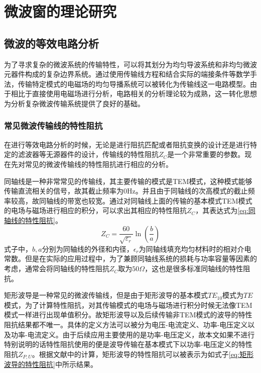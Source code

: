\documentclass[master]{thesis-uestc}
\begin{document}
\chapter{微波窗的理论研究}

\section{微波的等效电路分析}
为了寻求复杂的微波系统的传输特性，可以将其划分为均匀导波系统和非均匀微波元器件构成的复杂边界系统。通过使用传输线方程和结合实际的端接条件等数学手法，传输特定模式的电磁场的均匀导播系统可以被转化为传输线这一电路模型。由于相比于直接使用电磁场进行分析，电路相关的分析理论较为成熟，这一转化思想为分析复杂微波传输系统提供了良好的基础。
\subsection{常见微波传输线的特性阻抗}
在进行等效电路分析的时候，无论是进行阻抗匹配或者阻抗变换的设计还是进行特定的滤波器等无源器件的设计，传输线的特性阻抗\(Z_C\)是一个非常重要的参数。现在先对常见的微波传输线的特性阻抗进行相应的分析。

同轴线是一种非常常见的传输线，其主要传输的模式是TEM模式，这种模式能够传输直流相关的信号，故其截止频率为0Hz。并且由于同轴线的次高模式的截止频率较高，故同轴线的带宽也较宽。通过对同轴线上面的传输的基本模式TEM模式的电场与磁场进行相应的积分，可以求出其相应的特性阻抗\(Z_C\)，其表达式为\ref{eq:同轴线的特性阻抗}。
\begin{equation}\label{eq:同轴线的特性阻抗}
    Z_C = \frac{60}{\sqrt{\varepsilon_r}} \ln \left( \frac{b}{a} \right)
\end{equation}
式子中，\(b, a\)分别为同轴线的外径和内径，\(\epsilon_r\)为同轴线填充均匀材料时的相对介电常数。但是在实际的应用过程中，为了兼顾同轴线系统的损耗与功率容量等因素的考虑，通常会将同轴线的特性阻抗\(Z_C\)取为\(50 \Omega\)，这也是很多标准同轴线的特性阻抗。

矩形波导是一种常见的微波传输线，但是由于矩形波导的基本模式\(TE_{10}\)模式为\(TE\)模式，为了计算特性阻抗，对其传输模式的电场与磁场进行积分时候无法像TEM模式一样进行出现单值积分。故矩形波导以及后续传输非TEM模式的波导的特性阻抗结果都不唯一。具体的定义方法可以被分为电压-电流定义、功率-电压定义以及功率-电流定义。由于后续应用主要使用的是功率-电压定义，故本文如果不进行特别说明的话特性阻抗使用的便是波导传输在基本模式下以功率-电压定义的特性阻抗\(Z_{P, U}\)。根据文献\cite{heihil_characteristic_2006}中的计算，矩形波导的特性阻抗可以被表示为如式子\ref{eq:矩形波导的特性阻抗}中所示结果。
\end{document}
